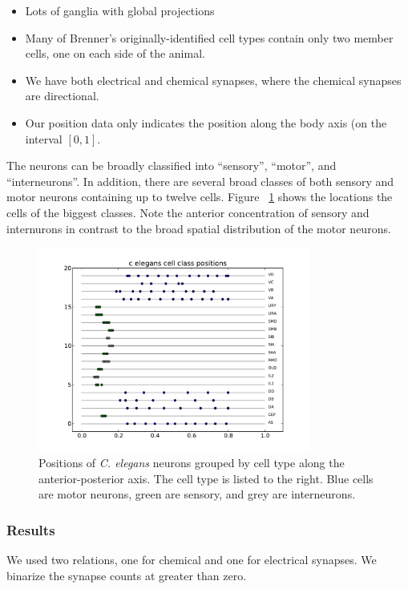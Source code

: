 \documentclass{article}
\begin{document}
\begin{itemize}
\item Lots of ganglia with global projections
\item Many of Brenner's originally-identified cell types contain only two member cells, one on each side of the animal. 
\item We have both electrical and chemical synapses, where the chemical synapses are directional. 
\item Our position data only indicates the position along the body axis (on the interval $[0, 1]$. 
\end{itemize}

The neurons can be broadly classified into ``sensory'', ``motor'', and
``interneurons''. In addition, there are several broad classes of both
sensory and motor neurons containing up to twelve cells. Figure ~\ref{fig:celegans:classestruth} shows the locations the cells of the biggest classes. Note the anterior concentration of sensory and internurons in contrast to the broad spatial distribution of the motor neurons. 

\begin{figure}
  \centering 
  \includegraphics[width=0.8\textwidth]{celegans/class.positions.pdf}
  \caption{Positions of \textit{C. elegans} neurons grouped by cell type along the anterior-posterior axis. The cell type is listed to the right. Blue cells are motor neurons, green are sensory, and grey are interneurons. }
  \label{fig:celegans:classestruth}
\end{figure}

\subsubsection{Results}
We used two relations, one for chemical and one for electrical synapses. 
We binarize the synapse counts at greater than zero. 
\end{document}
